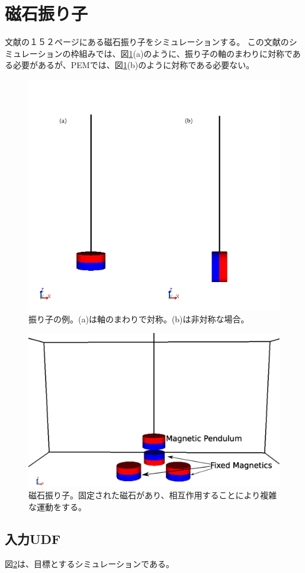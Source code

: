 \documentclass[a4paper,11pt]{jarticle}
\begin{document}
\section{磁石振り子}
文献\cite{doi}の１５２ページにある磁石振り子をシミュレーションする。
この文献のシミュレーションの枠組みでは、図\ref{fig:pendulum}(a)のように、振り子の軸のまわりに対称である必要があるが、PEMでは、図\ref{fig:pendulum}(b)のように対称である必要ない。
\begin{figure}[h]
\centering
  \includegraphics[clip,width=0.7\linewidth]{pendulum.png}
  \caption{振り子の例。(a)は軸のまわりで対称。(b)は非対称な場合。
  }
  \label{fig:pendulum}
\end{figure}
\begin{figure}[h]
\centering
  \includegraphics[clip,width=0.7\linewidth]{magneticPendulum.eps}
  \caption{磁石振り子。固定された磁石があり、相互作用することにより複雑な運動をする。
  }
  \label{fig:magneticPendulum}
\end{figure}
\subsection{入力UDF}
図\ref{fig:magneticPendulum}は、目標とするシミュレーションである。
\end{document}
